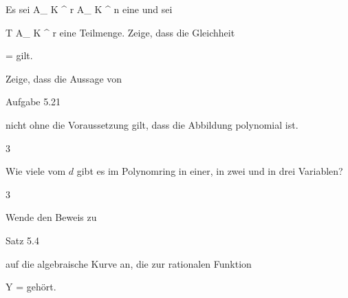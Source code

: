 {}
{





Es sei
\maabbdisp {\varphi} { { {\mathbb A}_{  K }^{  r   } } } { { {\mathbb A}_{  K }^{  n   } }
} {}
eine
und sei

\mavergleichskette
{\vergleichskette
{ T
}
{ \subseteq }{ { {\mathbb A}_{  K }^{  r   } }
}
{  }{
}
{    }{
}
{   }{}
}
{}{}{}
eine Teilmenge. Zeige, dass die Gleichheit

\mavergleichskettedisp
{\vergleichskette
{ 
}
{ =} { 
}
{ } {
}
{ } {
}
{ } {
}
}
{}{}{}
gilt.





}
{} {}

{}
{





Zeige, dass die Aussage von

Aufgabe 5.21

nicht ohne die Voraussetzung gilt, dass die Abbildung polynomial ist.





}
{} {}






{3}
{





Wie viele
vom
$d$ gibt es im Polynomring in einer, in zwei und in drei Variablen?





}
{} {}

{3}
{





Wende den Beweis zu

Satz 5.4

auf die algebraische Kurve an, die zur rationalen Funktion

\mavergleichskettedisp
{\vergleichskette
{Y
}
{ =} { {  }
}
{ } {
}
{ } {
}
{ } {
}
}
{}{}{}
gehört.





}
{} {}

